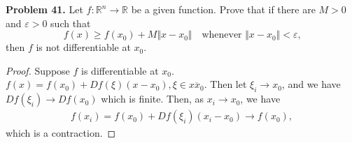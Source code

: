 \documentclass[12pt,leqno]{amsart}
\theoremstyle{definition}
\begin{document}
\noindent
{\bf Problem 41.}
Let $f:\mathbb{R}^n\to\mathbb{R}$ be a given function. Prove that if there are $M>0$ and $\varepsilon>0$ such that
$$
f(x)\geq f(x_0)+M\Vert x-x_0\Vert
\quad
\text{whenever $\Vert x-x_0\Vert<\varepsilon$,}
$$
then $f$ is not differentiable at $x_0$.
\begin{proof}
Suppose $f$ is differentiable at $x_0$. $f(x) = f(x_0) + D f(\xi) (x-x_0), \xi \in \overline{x x_0}$. Then let $\xi_i\to x_0$, and we have $D f(\xi_i) \to D f(x_0)$ which is finite. Then, as $x_i\to x_0$, we have 
\begin{align*}
    f(x_i) = f(x_0) + D f(\xi_i)(x_i - x_0) \to f(x_0),
\end{align*}
which is a contraction.
\end{proof}

\medskip
\end{document}
